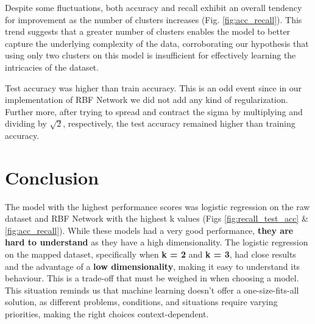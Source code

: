 \documentclass[a4paper,12pt]{article}
\begin{document}
Despite some fluctuations, both accuracy and recall exhibit an overall tendency for improvement as the number of clusters increases (Fig. \ref{fig:acc_recall}). This trend suggests that a greater number of clusters enables the model to better capture the underlying complexity of the data, corroborating our hypothesis that using only two clusters on this model is insufficient for effectively learning the intricacies of the dataset.

Test accuracy was higher than train accuracy. This is an odd event since in our implementation of RBF Network we did not add any kind of regularization. Further more, after trying to spread and contract the sigma by multiplying and dividing by $\sqrt{2}$, respectively, the test accuracy remained higher than training accuracy. 

\section{Conclusion}
The model with the highest performance scores was logistic regression on the raw dataset and RBF Network with the highest k values (Figs \ref{fig:recall_test_acc} \& \ref{fig:acc_recall}). While these models had a very good performance, \textbf{they are hard to understand} as they have a high dimensionality. The logistic regression on the mapped dataset, specifically when \textbf{k = 2} and \textbf{k = 3}, had close results and the advantage of a \textbf{low dimensionality}, making it easy to understand its behaviour. This is a trade-off that must be weighed in when choosing a model. 
This situation reminds us that machine learning doesn't offer a one-size-fits-all solution, as different problems, conditions, and situations require varying priorities, making the right choices context-dependent.
\label{sec:conclusion}
\end{document}
